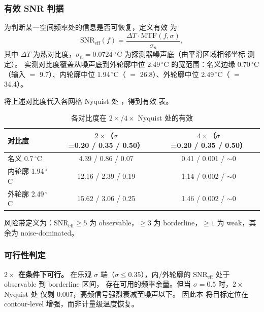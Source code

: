 \subsubsection{有效 SNR 判据}

为判断某一空间频率处的信息是否可恢复，定义有效  为
\[
  \mathrm{SNR}_{\mathrm{eff}}(f) = \frac{\Delta T \cdot \mathrm{MTF}(f,\sigma)}{\sigma_n},
\]
其中 \(\Delta T\) 为热对比度，\(\sigma_n = 0.0724\;^\circ\mathrm{C}\) 为探测器噪声底（由平滑区域相邻坐标  测定）。
实测对比度覆盖从噪声底到外轮廓中位 2.49\,\(^\circ\)C 的宽范围：名义边缘 0.70\,\(^\circ\)C（输入  \(=\) 9.7）、内轮廓中位 1.94\,\(^\circ\)C（ \(=\) 26.8）、外轮廓中位 2.49\,\(^\circ\)C（ \(=\) 34.4）。

将上述对比度代入各网格 Nyquist 处 ，得到有效  表。

\begin{table}[ht]
  \centering
  \caption{各对比度在 \(2\times\)/\(4\times\) Nyquist 处的有效 }
  \label{tab:snr-eff}
  \small
  \begin{tabular}{lcc}
    \toprule
    对比度 & \(2\times\)（\(\sigma\)=0.20 / 0.35 / 0.50） & \(4\times\)（\(\sigma\)=0.20 / 0.35 / 0.50） \\
    \midrule
    名义 0.7\,\(^\circ\)C    & 4.39 / 0.86 / 0.07   & 0.41 / 0.001 / \(\sim\)0 \\
    内轮廓 1.94\,\(^\circ\)C & 12.16 / 2.39 / 0.19  & 1.14 / 0.002 / \(\sim\)0 \\
    外轮廓 2.49\,\(^\circ\)C & 15.62 / 3.06 / 0.25  & 1.46 / 0.002 / \(\sim\)0 \\
    \bottomrule
  \end{tabular}
\end{table}

风险带定义为：\(\mathrm{SNR}_{\mathrm{eff}} \ge 5\) 为 observable，\(\ge 3\) 为 borderline，\(\ge 1\) 为 weak，其余为 noise-dominated。

\subsubsection{可行性判定}

\textbf{\(2\times\) 在条件下可行。} 在乐观 \(\sigma\) 端（\(\sigma \le 0.35\)），内/外轮廓的 \(\mathrm{SNR}_{\mathrm{eff}}\) 处于 observable 到 borderline 区间，
存在可用的频率余量。但当 \(\sigma = 0.5\) 时，\(2\times\) Nyquist 处  仅剩 0.007，高频信号强烈衰减至噪声以下。
因此本  将目标定位在 contour-level 增强，而非计量级温度恢复。

